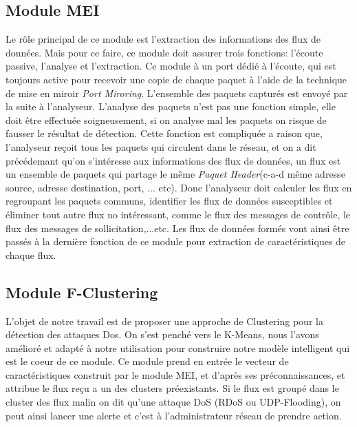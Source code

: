 \newpage
\subsection{Module MEI}
Le rôle principal de ce module est l'extraction des informations des flux de données. Mais pour ce faire, ce module doit assurer trois fonctions: l'écoute passive, l'analyse et l'extraction. Ce module à un port dédié à l'écoute, qui est toujours active pour recevoir une copie de chaque paquet à l'aide de la technique de mise en miroir \textit{Port Miroring}. L'ensemble des paquets capturés est envoyé par la suite à l'analyseur. L'analyse des paquets n'est pas une fonction simple, elle doit être effectuée soigneusement, si on analyse mal les paquets on risque de fausser le résultat de détection. Cette fonction est compliquée a raison que, l'analyseur reçoit tous les paquets qui circulent dans le réseau, et on a dit précédemant qu'on s'intéresse aux informations des flux de données, un flux est un ensemble de paquets qui partage le même \textit{Paquet Header}(c-a-d même adresse source, adresse destination, port, ... etc). Donc l'analyseur doit calculer les flux en regroupant les paquets communs, identifier les flux de données susceptibles et éliminer tout autre flux no intéressant, comme le flux des messages de contrôle, le flux des messages de sollicitation,...etc. Les flux de données formés vont ainsi être passés à la dernière fonction de ce module pour extraction de caractéristiques de chaque flux.

\subsection{Module F-Clustering}
L'objet de notre travail est de proposer une approche de Clustering pour la détection des attaques Dos. On s'est penché vers le K-Means, nous l'avons amélioré et adapté à notre utilisation pour construire notre modèle intelligent qui est le coeur de ce module. Ce module prend en entrée le vecteur de caractéristiques construit par le module MEI, et d'après ses préconnaissances, et attribue le flux reçu a un des clusters préexistants. Si le flux est groupé dans le cluster des flux malin on dit qu'une attaque DoS (RDoS ou UDP-Flooding), on peut ainsi lancer une alerte et c'est à l'administrateur réseau de prendre action.

